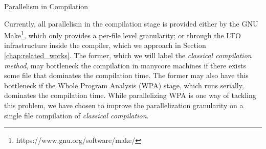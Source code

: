 \begin{section}{Parallelism in Compilation}



Currently, all parallelism in the compilation stage is provided either by the
GNU Make\footnote{https://www.gnu.org/software/make/}, which only provides a
per-file level granularity; or through the LTO infrastructure inside the compiler, which we
approach in Section \ref{chap:related_works}. The former, which we will label
the \textit{classical compilation method}, may bottleneck the compilation in
manycore machines if there exists some file that dominates the compilation time.
The former may also have this bottleneck if the Whole Program Analysis (WPA) stage,
which runs serially, dominates the compilation time. While parallelizing
WPA is one way of tackling this problem, we have chosen to improve the parallelization
granularity on a single file compilation of \textit{classical compilation}.




\end{section}
